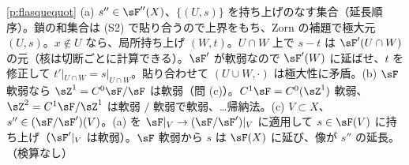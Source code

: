 \begin{sol}{\ref{p:flasquequot}}
(a) $s''\in\sF''(X)$、$\{(U,s)\}$ を持ち上げのなす集合（延長順序）。鎖の和集合は (S2) で貼り合うので上界をもち、Zorn の補題で極大元 $(U,s)$。$x\notin U$ なら、局所持ち上げ $(W,t)$。$U\cap W$ 上で $s-t$ は $\sF'(U\cap W)$ の元（核は切断ごとに計算できる）。$\sF'$ が軟弱なので $\sF'(W)$ に延ばせ、$t$ を修正して $t'|_{U\cap W}=s|_{U\cap W}$。貼り合わせて $(U\cup W,\cdot)$ は極大性に矛盾。(b) $\sF$ 軟弱なら $\sZ^1=C^0\sF/\sF$ は軟弱（問 (c)）。$C^1\sF=C^0(\sZ^1)$ 軟弱、$\sZ^2=C^1\sF/\sZ^1$ は軟弱 $/$ 軟弱で軟弱、…帰納法。(c) $V\subset X$、$s''\in(\sF/\sF')(V)$。(a) を $\sF|_V\to(\sF/\sF')|_V$ に適用して $s\in\sF(V)$ に持ち上げ（$\sF'|_V$ は軟弱）。$\sF$ 軟弱から $s$ は $\sF(X)$ に延び、像が $s''$ の延長。（検算なし）
\end{sol}

